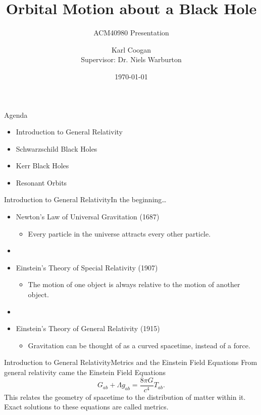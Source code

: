 \documentclass[12pt]{beamer}
\title{Orbital Motion about a Black Hole}
\subtitle{ACM40980 Presentation}
\author[Karl Coogan]{Karl Coogan\\[10mm]{Supervisor: Dr. Niels Warburton}}
\date{\today}
\begin{document}
\maketitle

\begin{frame}{Agenda}
\begin{itemize}
    \item Introduction to General Relativity
    \item Schwarzschild Black Holes
    \item Kerr Black Holes
    \item \alert<2>{Resonant Orbits}
\end{itemize}
\end{frame}

\begin{frame}{Introduction to General Relativity}{In the beginning\ldots}
\begin{itemize}
    \item[] Newton's Law of Universal Gravitation (1687)
    \begin{itemize}
        \item Every particle in the universe attracts every other particle.
    \end{itemize}
    \item[]
    \item[] Einstein's Theory of Special Relativity (1907)
    \begin{itemize}
        \item The motion of one object is always relative to the motion of another object.
    \end{itemize}
    \item[]
    \item[] Einstein's Theory of General Relativity (1915)
    \begin{itemize}
        \item Gravitation can be thought of as a curved spacetime, instead of a force.
    \end{itemize}
\end{itemize}
\end{frame}

\begin{frame}{Introduction to General Relativity}{Metrics and the Einstein Field Equations}
From general relativity came the Einstein Field Equations
\begin{equation}
    G_{ab}+\Lambda g_{ab}=\frac{8\pi G}{c^4}T_{ab}.
\end{equation}
This relates the geometry of spacetime to the distribution of matter within it.\\
\vskip10pt
Exact solutions to these equations are called metrics.
\end{frame}
\end{document}

